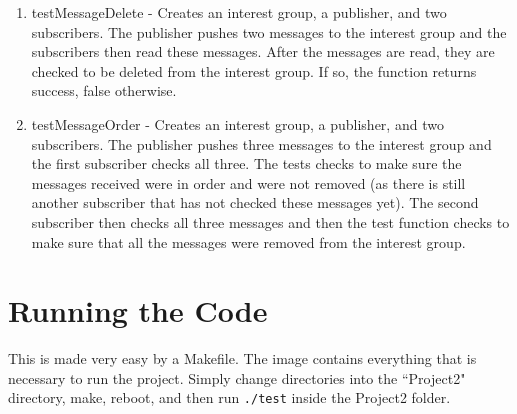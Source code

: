 \documentclass{article}
\begin{document}
\begin{enumerate}
	\item testMessageDelete - Creates an interest group, a publisher, and two subscribers.  The publisher pushes two messages to the interest group and the subscribers then read these messages.  After the messages are read, they are checked to be deleted from the interest group.  If so, the function returns success, false otherwise.
	\item testMessageOrder - Creates an interest group, a publisher, and two subscribers.  The publisher pushes three messages to the interest group and the first subscriber checks all three.  The tests checks to make sure the messages received were in order and were not removed (as there is still another subscriber that has not checked these messages yet).  The second subscriber then checks all three messages and then the test function checks to make sure that all the messages were removed from the interest group.
\end{enumerate}

\section{Running the Code}

This is made very easy by a Makefile.  The image contains everything that is necessary to run the project.  Simply change directories into the ``Project2" directory, make, reboot, and then run \verb+./test+ inside the Project2 folder.
\end{document}
